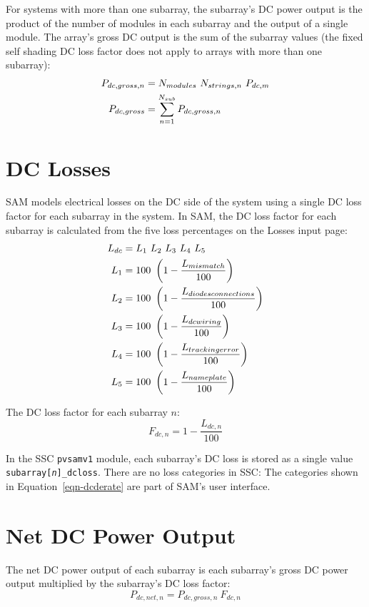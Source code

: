 \documentclass[12pt,letterpaper]{article}
\begin{document}
For systems with more than one subarray, the subarray's DC power output is the product of the number of modules in each subarray and the output of a single module. The array's gross DC output is the sum of the subarray values (the fixed self shading DC loss factor does not apply to arrays with more than one subarray):
\begin{align}
P_{dc,gross,n} &= N_{modules}~N_{strings,n}~P_{dc,m} \notag\\
P_{dc,gross} &= \sum_{n=1}^{N_{sub}} P_{dc,gross,n}
\end{align}

\section{DC Losses} \label{sec-dclosses}

SAM models electrical losses on the DC side of the system using a single DC loss factor for each subarray in the system. In SAM, the DC loss factor for each subarray is calculated from the five loss percentages on the Losses input page:
\begin{align}\label{eqn-dcderate}
L_{dc} &= L_1~L_2~L_3~L_4~L_5 \notag\\
L_{1} &= 100~\left(1-\frac{L_{mismatch}}{100}\right) \notag\\
L_{2} &= 100~\left(1-\frac{L_{diodesconnections}}{100}\right) \notag\\
L_{3} &= 100~\left(1-\frac{L_{dcwiring}}{100}\right) \notag\\
L_{4} &= 100~\left(1-\frac{L_{trackingerror}}{100}\right) \notag\\
L_{5} &= 100~\left(1-\frac{L_{nameplate}}{100}\right)
\end{align}

The DC loss factor for each subarray $n$:
\begin{equation}
F_{dc,n}=1 - \frac{L_{dc,n}}{100}
\end{equation}

In the SSC \texttt{pvsamv1} module, each subarray's DC loss is stored as a single value \texttt{subarray[\textit{n}]\_dcloss}. There are no loss categories in SSC: The categories shown in Equation~\ref{eqn-dcderate} are part of SAM's user interface.

\section{Net DC Power Output}

The net DC power output of each subarray is each subarray's gross DC power output multiplied by the subarray's DC loss factor:
\begin{equation}
P_{dc,net,n} = P_{dc,gross,n}~F_{dc,n}
\end{equation}
\end{document}
